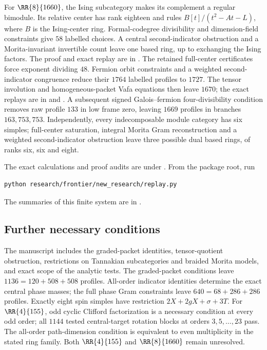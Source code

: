 \documentclass[11pt]{article}
\begin{document}
For $\RR{8}{1660}$, the Ising subcategory makes its complement a
regular bimodule. Its relative center has rank eighteen and rules
$B[t]/(t^2-At-L)$, where $B$ is the Ising-center ring.
Formal-codegree divisibility and dimension-field constraints give
$58$ labelled choices. A central second-indicator obstruction and a
Morita-invariant invertible count leave one based ring, up to exchanging
the Ising factors.
The proof and exact replay are in
.
The retained full-center certificates force exponent dividing $48$.
Fermion orbit constraints and a weighted second-indicator congruence
reduce their $1764$ labelled profiles to $1727$. The tensor involution and
homogeneous-packet Vafa equations then leave $1670$; the exact replays are in
 and
.
A subsequent signed Galois--fermion four-divisibility condition removes
raw profile $133$ in low frame zero, leaving $1669$ profiles in branches
$163,753,753$. Independently, every indecomposable module category has
six simples; full-center saturation, integral Morita Gram reconstruction
and a weighted second-indicator obstruction leave three possible dual
based rings, of ranks six, six and eight.

The exact calculations and proof audits are under
. From the package root, run
\begin{verbatim}
python research/frontier/new_research/replay.py
\end{verbatim}
The summaries of this finite system are in
.

\subsection{Further necessary conditions}
The manuscript includes the graded-packet identities,
tensor-quotient obstruction, restrictions on Tannakian subcategories and
braided Morita models, and exact scope of the analytic tests.
The graded-packet conditions leave $1136=120+508+508$ profiles.
All-order indicator identities determine the exact central phase masses;
the full phase Gram constraints leave $640=68+286+286$ profiles.
Exactly eight spin simples have restriction $2X+2gX+\sigma+3T$.
For $\RR{4}{155}$, odd cyclic Clifford factorization is a necessary
condition at every odd order; all $1144$ tested central-target rotation
blocks at orders $3,5,\ldots,23$ pass. The all-order path-dimension
condition is equivalent to even multiplicity in the stated ring family.
Both $\RR{4}{155}$ and $\RR{8}{1660}$ remain unresolved.
\end{document}
